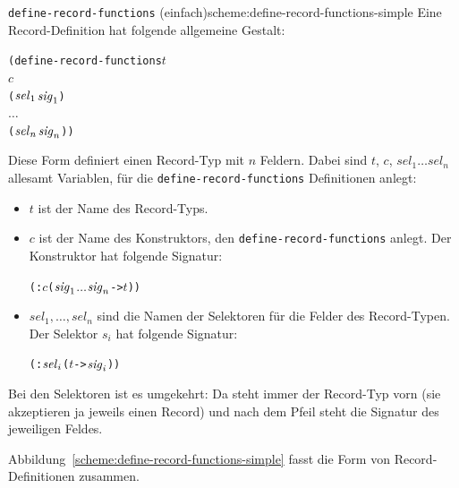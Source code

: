 \begin{feature}{\texttt{define-record-functions} (einfach)}{scheme:define-record-functions-simple}
Eine Record-Definition
hat folgende allgemeine Gestalt:\label{def:define-record-functions}
%
\begin{alltt}
(define-record-functions \(t\)
  \(c\)
  (\(\mathit{sel}\sb{1}\) \(\mathit{sig}\sb{1}\))
  \(\ldots\)
  (\(\mathit{sel}\sb{n}\) \(\mathit{sig}\sb{n}\)))
\end{alltt}
%
Diese Form definiert einen Record-Typ mit $n$ Feldern.
Dabei sind $t$, $c$, $\mathit{sel}_1 \ldots \mathit{sel}_n$ allesamt Variablen, für die
\texttt{define-record-functions} Definitionen anlegt:
%
\begin{itemize}
\item $t$ ist der Name des Record-Typs.
\item $c$ ist der Name des Konstruktors, den
  \texttt{define-record-functions} anlegt.  Der Konstruktor hat 
  folgende Signatur:
%  
\begin{alltt}
(: \(c\) (\(\mathit{sig}\sb{1}\) \(\ldots\) \(\mathit{sig}\sb{n}\) -> \(t\)))
\end{alltt}
\item $\mathit{sel}_1, \ldots, \mathit{sel}_n$ sind die Namen der Selektoren für die Felder
  des Record-Typen.  Der Selektor $s_i$ hat folgende Signatur:
% 
\begin{alltt}
(: \(\mathit{sel}\sb{i}\) (\(t\) -> \(\mathit{sig}\sb{i}\)))
\end{alltt}
\end{itemize}
%
\end{feature}

Bei den Selektoren ist es umgekehrt: Da steht immer der Record-Typ
vorn (sie akzeptieren ja jeweils einen Record) und nach dem Pfeil
steht die Signatur des jeweiligen Feldes.

Abbildung~\ref{scheme:define-record-functions-simple} fasst die Form
von Record-Definitionen zusammen.

